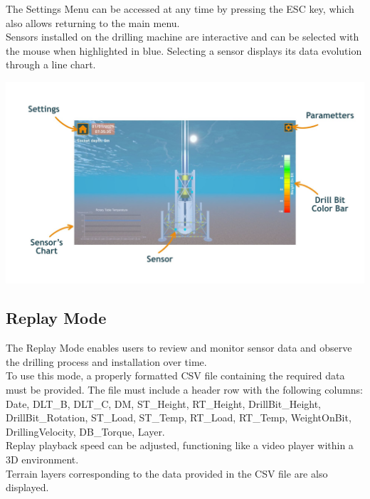 \documentclass{article}
\begin{document}
The Settings Menu can be accessed at any time by pressing the ESC key, which also allows returning to the main menu.\\

Sensors installed on the drilling machine are interactive and can be selected with the mouse when highlighted in blue. Selecting a sensor displays its data evolution through a line chart.
\begin{center}
    \includegraphics[width=6in]{DrillingMode.jpg}
\end{center}

\subsection{Replay Mode}\hfill

The Replay Mode enables users to review and monitor sensor data and observe the drilling process and installation over time.\\

To use this mode, a properly formatted CSV file containing the required data must be provided. The file must include a header row with the following columns:\\
Date, DLT\_B, DLT\_C, DM, ST\_Height, RT\_Height, DrillBit\_Height, DrillBit\_Rotation, ST\_Load, ST\_Temp, RT\_Load, RT\_Temp, WeightOnBit, DrillingVelocity, DB\_Torque, Layer.\\

Replay playback speed can be adjusted, functioning like a video player within a 3D environment.\\

Terrain layers corresponding to the data provided in the CSV file are also displayed.\\
\end{document}
